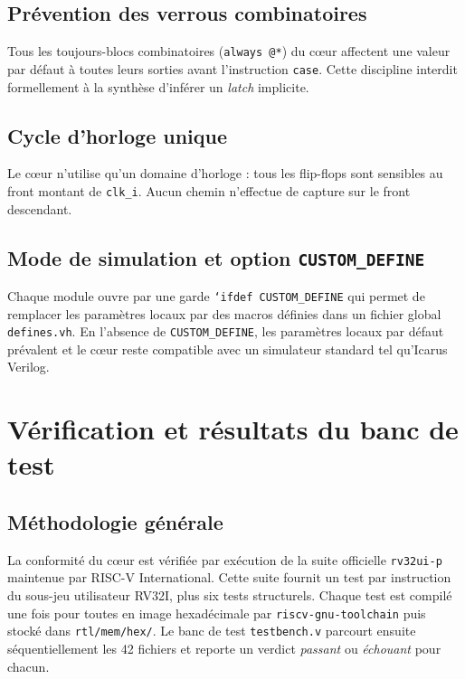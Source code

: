 \documentclass[11pt,a4paper,oneside]{report}
\begin{document}
\section{Prévention des verrous combinatoires}
Tous les toujours-blocs combinatoires (\texttt{always @*}) du
c\oe{}ur affectent une valeur par défaut à toutes leurs sorties
avant l'instruction \texttt{case}. Cette discipline interdit
formellement à la synthèse d'inférer un \textit{latch} implicite.

\section{Cycle d'horloge unique}
Le c\oe{}ur n'utilise qu'un domaine d'horloge : tous les
flip-flops sont sensibles au front montant de \texttt{clk\_i}.
Aucun chemin n'effectue de capture sur le front descendant.

\section{Mode de simulation et option \texttt{CUSTOM\_DEFINE}}
Chaque module ouvre par une garde
\texttt{`ifdef CUSTOM\_DEFINE} qui permet de remplacer les
paramètres locaux par des macros définies dans un fichier global
\texttt{defines.vh}. En l'absence de \texttt{CUSTOM\_DEFINE},
les paramètres locaux par défaut prévalent et le c\oe{}ur reste
compatible avec un simulateur standard tel qu'Icarus Verilog.


\chapter{Vérification et résultats du banc de test}
\label{ch:verif}

\section{Méthodologie générale}
La conformité du c\oe{}ur est vérifiée par exécution de la suite
officielle \texttt{rv32ui-p} maintenue par RISC-V International.
Cette suite fournit un test par instruction du sous-jeu utilisateur
RV32I, plus six tests structurels. Chaque test est compilé une
fois pour toutes en image hexadécimale par
\texttt{riscv-gnu-toolchain} puis stocké dans
\texttt{rtl/mem/hex/}. Le banc de test \texttt{testbench.v}
parcourt ensuite séquentiellement les 42 fichiers et reporte un
verdict \emph{passant} ou \emph{échouant} pour chacun.
\end{document}
